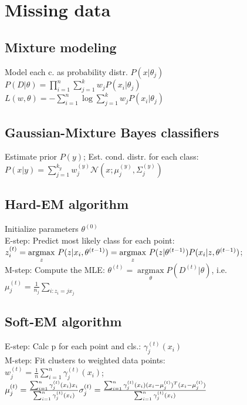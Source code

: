 \section*{Missing data}
\subsection*{Mixture modeling}

Model each c. as probability distr. $P(x|\theta_j)$\\
$P(D|\theta) = \prod_{i=1}^n \sum_{j=1}^k w_j P(x_i|\theta_j)$\\
$L(w, \theta) = - \sum_{i=1}^n \operatorname{log}  \sum_{j=1}^k w_j P(x_i| \theta_j)$

\subsection*{Gaussian-Mixture Bayes classifiers}
Estimate prior $P(y)$; Est. cond. distr. for each class:
$P(x|y) = \sum_{j=1}^{k_y} w_j^{(y)} \mathcal{N}(x; \mu_j^{(y)}, \Sigma_j^{(y)})$\\

\subsection*{Hard-EM algorithm}
Initialize parameters $\theta^{(0)}$\\
E-step: Predict most likely class for each point:
$z_i^{(t)} = \underset{z}{\operatorname{argmax}} ~ P(z|x_i, \theta^{(t-1)})\\
= \underset{z}{\operatorname{argmax}} ~ P(z|\theta^{(t-1)}) P(x_i|z,\theta^{(t-1)})$;\\
M-step: Compute the MLE: $\theta^{(t)} = \underset{\theta}{\operatorname{argmax}} P(D^{(t)}|\theta)$, i.e. $\mu_j^{(t)} = \frac{1}{n_j} \sum_{i: z_i = j x_j}$

\subsection*{Soft-EM algorithm}
E-step: Calc p for each point and cls.: $\gamma_j^{(t)}(x_i)$\\
M-step: Fit clusters to weighted data points:\\
$w_j^{(t)} = \frac{1}{n} \sum_{i=1}^n \gamma_j^{(t)} (x_i)$; 
$\mu_j^{(t)} = \frac{\sum_{i=1}^n \gamma_j^{(t)} (x_i) x_i}{\sum_{i=1}^n \gamma_j^{(t)} (x_i)}\\ %
\sigma_j^{(t)} = \frac{\sum_{i=1}^n \gamma_j^{(t)}(x_i) (x_i - \mu_j^{(t)})^T (x_i - \mu_j^{(t)})}{\sum_{i=1}^n \gamma_j^{(t)}(x_i)}$


